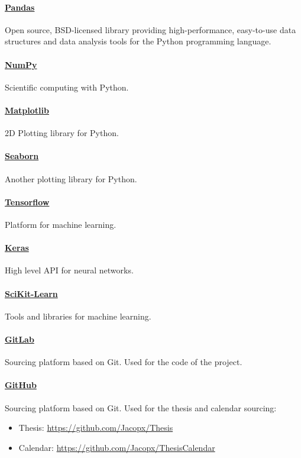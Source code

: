 \documentclass[%
    corpo=12pt,
    twoside,
    oldstyle,
    autoretitolo,
    greek,
    evenboxes,
]{toptesi}
\begin{document}
\paragraph{\href{https://pandas.pydata.org/}{Pandas}} Open source, BSD-licensed library providing high-performance, easy-to-use data structures and data analysis tools for the Python programming language.

\paragraph{\href{https://numpy.org/}{NumPy}} Scientific computing with Python.

\paragraph{\href{https://matplotlib.org/}{Matplotlib}} 2D Plotting library for Python.

\paragraph{\href{https://seaborn.pydata.org/}{Seaborn}} Another plotting library for Python.

\paragraph{\href{https://www.tensorflow.org/}{Tensorflow}} Platform for machine learning.

\paragraph{\href{https://keras.io/}{Keras}} High level API for neural networks.

\paragraph{\href{https://scikit-learn.org/stable/}{SciKit-Learn}} Tools and libraries for machine learning.

\paragraph{\href{https://gitlab.com}{GitLab}} Sourcing platform based on Git. Used for the code of the project.

\paragraph{\href{https://github.com}{GitHub}} Sourcing platform based on Git. Used for the thesis and calendar sourcing:
\begin{itemize}
  \item Thesis: \url{https://github.com/Jacopx/Thesis}
  \item Calendar: \url{https://github.com/Jacopx/ThesisCalendar}
\end{itemize}
\end{document}
